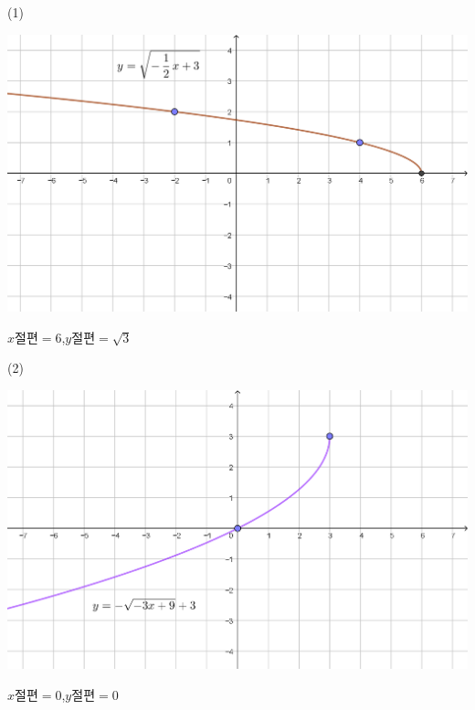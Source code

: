\documentclass{oblivoir}
\begin{document}
\begin{multicols*}{2}
%
(1)
\begin{center}
\includegraphics[width=0.99\columnwidth]{irrational_7-1}
\end{center}
\(x절편=6\),\qquad\(y절편=\sqrt3\)
\par\bigskip\noindent
(2)
\begin{center}
\includegraphics[width=0.99\columnwidth]{irrational_7-2}
\end{center}
\(x절편=0\),\qquad\(y절편=0\)
\end{multicols*}


\end{document}
